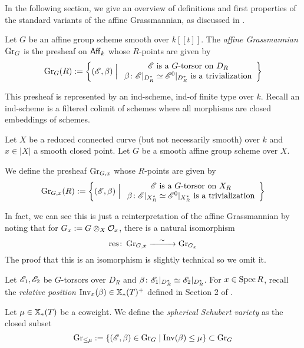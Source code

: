 \documentclass[12pt]{article}
\begin{document}
In the following section, we give an overview of definitions and first properties of the standard variants of the affine Grassmannian, as discussed in \cite{zhu}. 

\begin{defn}
    Let $G$ be an affine group scheme smooth over $k[[t]]$. The \textit{affine Grassmannian} $\operatorname{Gr}_G$ is the presheaf on $\operatorname{\mathsf{Aff}}_k$ whose $R$-points are given by
    \[\operatorname{Gr}_G(R) := \left\{(\mathscr{E},\beta) \;\Big\vert\; \begin{array}{c}
    \mathscr{E} \text{ is a } G \text{-torsor on } D_R \\ 
    \beta \colon \mathscr{E}\vert_{D_R^*} \simeq \mathscr{E}^0\vert_{D_R^*} \text{ is a trivialization} 
    \end{array} \right\}\]
\end{defn}

This presheaf is represented by an ind-scheme, ind-of finite type over $k$. Recall an ind-scheme is a filtered colimit of schemes where all morphisms are closed embeddings of schemes.

Let $X$ be a reduced connected curve (but not necessarily smooth) over $k$ and $x \in |X|$ a smooth closed point. Let $G$ be a smooth affine group scheme over $X$.
\begin{defn}
    We define the presheaf $\operatorname{Gr}_{G,x}$ whose $R$-points are given by
    \[\operatorname{Gr}_{G,x}(R) := \left\{(\mathscr{E},\beta) \;\Big\vert\; \begin{array}{c}
        \mathscr{E} \text{ is a } G\text{-torsor on } X_R \\
        \beta \colon \mathscr{E}\vert_{X_R^*} \simeq \mathscr{E}^0\vert_{X_R^*} \text{ is a trivialization} 
    \end{array}\right\}\]
\end{defn}
In fact, we can see this is just a reinterpretation of the affine Grassmannian by noting that for $G_x := G \otimes_X \mathcal{O}_x$, there is a natural isomorphism
\[\text{res} \colon \operatorname{Gr}_{G,x} \xrightarrow{\quad \sim \quad} \operatorname{Gr}_{G_x}\]
The proof that this is an isomorphism is slightly technical so we omit it.

Let $\mathscr{E}_1, \mathscr{E}_2$ be $G$-torsors over $D_R$ and $\beta \colon \mathscr{E}_1\vert_{D_R^*} \simeq \mathscr{E}_2\vert_{D_R^*}$. For $x \in \operatorname{Spec} R$, recall the \textit{relative position} $\operatorname{Inv}_x(\beta) \in \mathbb{X}_*(T)^+$ defined in Section 2 of \cite{zhu}.

\begin{defn}
    Let $\mu \in \mathbb{X}_*(T)$ be a coweight. We define the \textit{spherical Schubert variety} as the closed subset
    \[\operatorname{Gr}_{\leq \mu} := \{(\mathscr{E}, \beta) \in \operatorname{Gr}_G \mid \operatorname{Inv}(\beta) \leq \mu\} \subset \operatorname{Gr}_G\]
\end{defn}
\end{document}
